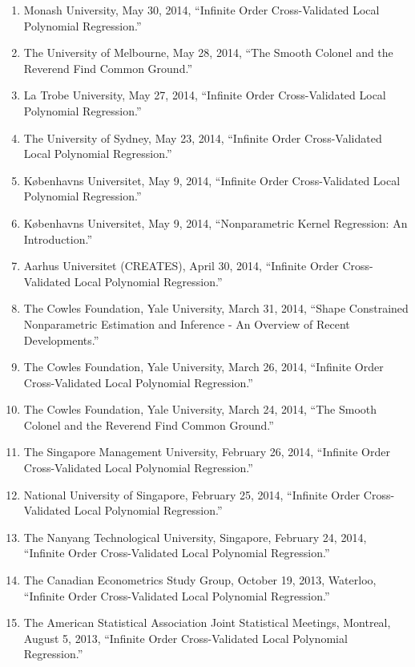 \documentclass[
]{article}
\begin{document}
\begin{enumerate}
  Rimini Center for Economic Analysis, June 9, 2014, ``The Smooth
  Colonel and the Reverend Find Common Ground.''
\item
  Monash University, May 30, 2014, ``Infinite Order Cross-Validated
  Local Polynomial Regression.''
\item
  The University of Melbourne, May 28, 2014, ``The Smooth Colonel and
  the Reverend Find Common Ground.''
\item
  La Trobe University, May 27, 2014, ``Infinite Order Cross-Validated
  Local Polynomial Regression.''
\item
  The University of Sydney, May 23, 2014, ``Infinite Order
  Cross-Validated Local Polynomial Regression.''
\item
  Københavns Universitet, May 9, 2014, ``Infinite Order Cross-Validated
  Local Polynomial Regression.''
\item
  Københavns Universitet, May 9, 2014, ``Nonparametric Kernel
  Regression: An Introduction.''
\item
  Aarhus Universitet (CREATES), April 30, 2014, ``Infinite Order
  Cross-Validated Local Polynomial Regression.''
\item
  The Cowles Foundation, Yale University, March 31, 2014, ``Shape
  Constrained Nonparametric Estimation and Inference - An Overview of
  Recent Developments.''
\item
  The Cowles Foundation, Yale University, March 26, 2014, ``Infinite
  Order Cross-Validated Local Polynomial Regression.''
\item
  The Cowles Foundation, Yale University, March 24, 2014, ``The Smooth
  Colonel and the Reverend Find Common Ground.''
\item
  The Singapore Management University, February 26, 2014, ``Infinite
  Order Cross-Validated Local Polynomial Regression.''
\item
  National University of Singapore, February 25, 2014, ``Infinite Order
  Cross-Validated Local Polynomial Regression.''
\item
  The Nanyang Technological University, Singapore, February 24, 2014,
  ``Infinite Order Cross-Validated Local Polynomial Regression.''
\item
  The Canadian Econometrics Study Group, October 19, 2013, Waterloo,
  ``Infinite Order Cross-Validated Local Polynomial Regression.''
\item
  The American Statistical Association Joint Statistical Meetings,
  Montreal, August 5, 2013, ``Infinite Order Cross-Validated Local
  Polynomial Regression.''

\end{enumerate}
\end{document}
